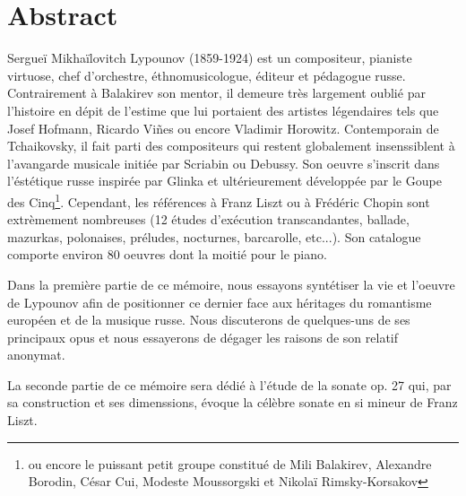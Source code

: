 
\chapter*{Abstract}

Sergueï Mikhaïlovitch Lypounov (1859-1924) est un compositeur, pianiste virtuose,
chef d'orchestre, éthnomusicologue, éditeur et pédagogue russe. Contrairement à
Balakirev son mentor, il demeure très largement oublié par l'histoire en dépit
de l'estime que lui portaient des artistes légendaires tels que Josef Hofmann,
Ricardo Vi\~{n}es ou encore Vladimir Horowitz.
Contemporain de Tchaikovsky, il fait parti des compositeurs qui restent globalement
insenssiblent à l'avangarde musicale initiée par Scriabin ou Debussy. Son oeuvre
s'inscrit dans l'éstétique russe inspirée par Glinka et ultérieurement développée
par le Goupe des Cinq\footnote{ou encore le puissant petit groupe constitué de Mili
Balakirev, Alexandre Borodin, César Cui, Modeste Moussorgski et Nikolaï
Rimsky-Korsakov}. Cependant, les références à Franz Liszt ou à Frédéric Chopin
sont extrèmement nombreuses (12 études d'exécution transcandantes, ballade,
mazurkas, polonaises, préludes, nocturnes, barcarolle, etc...). Son catalogue
comporte environ 80 oeuvres dont la moitié pour le piano.

Dans la première partie de ce mémoire, nous essayons syntétiser la vie et
l'oeuvre de Lypounov afin de positionner ce dernier face aux héritages du
romantisme européen et de la musique russe. Nous discuterons de quelques-uns
de ses principaux opus et nous essayerons de dégager les raisons de son relatif
anonymat.

La seconde partie de ce mémoire sera dédié à l'étude de la sonate op. 27 qui,
par sa construction et ses dimenssions, évoque la célèbre sonate en si mineur
de Franz Liszt.

